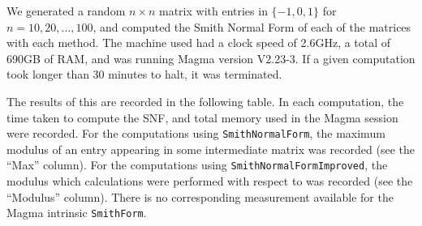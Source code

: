 \documentclass[12pt,a4paper,answers]{exam}
\theoremstyle{definition}
\begin{document}
We generated a random $n\times n$ matrix with entries in $\{-1,0,1\}$ for $n=10,20,\ldots,100$, and computed the Smith Normal Form of each of the matrices with each method. The machine used had a clock speed of 2.6GHz, a total of 690GB of RAM, and was running {\sc Magma} version V2.23-3. If a given computation took longer than 30 minutes to halt, it was terminated.

The results of this are recorded in the following table. In each computation, the time taken to compute the SNF, and total memory used in the {\sc Magma} session were recorded. For the computations using \texttt{SmithNormalForm}, the maximum modulus of an entry appearing in some intermediate matrix was recorded (see the ``Max'' column). For the computations using \texttt{SmithNormalFormImproved}, the modulus which calculations were performed with respect to was recorded (see the ``Modulus'' column). There is no corresponding measurement available for the {\sc Magma} intrinsic \texttt{SmithForm}.

  {\centering
  }\newline
\end{document}
